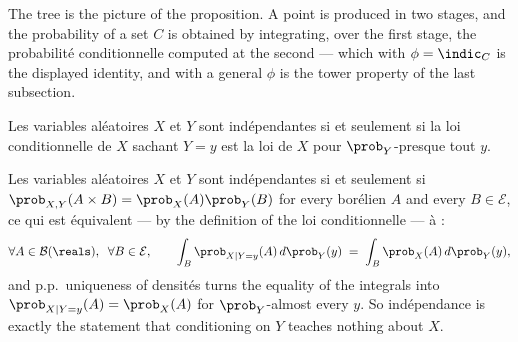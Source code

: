 \begin{figure}[h!]
  \centering
\end{figure}

The tree is the picture of the proposition. A point is produced in two stages,
and the probability of a set $C$ is obtained by integrating, over the first
stage, the probabilité conditionnelle computed at the second --- which with
$\phi = \indic_{C}$ is the displayed identity, and with a general $\phi$ is
the tower property of the last subsection.

\begin{prop}[Indépendance]
  Les variables aléatoires $X$ et $Y$ sont indépendantes si et seulement si la loi
  conditionnelle de $X$ sachant $Y = y$ est la loi de $X$ pour $\prob_{Y}$-presque
  tout $y$.
\end{prop}

Les variables aléatoires $X$ et $Y$ sont indépendantes si et seulement si
$\prob_{X,Y}(A \times B) = \prob_{X}(A) \prob_{Y}(B)$ for every borélien $A$ and every
$B \in \mathcal{E}$, ce qui est équivalent --- by the definition of the loi
conditionnelle --- à :
\[
  \forall A \in \mathcal{B}(\reals), \;\; \forall B \in \mathcal{E}, \qquad
  \int_{B} \prob_{X \mid Y = y}(A) \, d\prob_{Y}(y) \;=\; \int_{B} \prob_{X}(A) \, d\prob_{Y}(y) ,
\]
and p.p.\ uniqueness of densités turns the equality of the integrals into
$\prob_{X \mid Y = y}(A) = \prob_{X}(A)$ for $\prob_{Y}$-almost every $y$. So
indépendance is exactly the statement that conditioning on $Y$ teaches nothing
about $X$.

